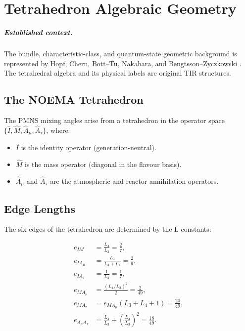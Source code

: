 \chapter{Tetrahedron Algebraic Geometry}
\label{app:tetrahedron}


\paragraph{Established context.}
The bundle, characteristic-class, and quantum-state geometric background is
represented by Hopf, Chern, Bott--Tu, Nakahara, and Bengtsson--Zyczkowski
\cite{Hopf1931,Chern1946,BottTu1982,Nakahara2003,BengtssonZyczkowski2006}.
The tetrahedral algebra and its physical labels are original TIR structures.

\section{The NOEMA Tetrahedron}

The PMNS mixing angles arise from a tetrahedron in the operator space
$\{\hat I, \hat M, \hat A_\mu, \hat A_\tau\}$, where:

\begin{itemize}
\item $\hat I$ is the identity operator (generation-neutral).
\item $\hat M$ is the mass operator (diagonal in the flavour basis).
\item $\hat A_\mu$ and $\hat A_\tau$ are the atmospheric and reactor
annihilation operators.
\end{itemize}

\section{Edge Lengths}

The six edges of the tetrahedron are determined by the L-constants:

\[
\begin{aligned}
e_{IM} &= \frac{L_4}{L_3} = \frac{2}{7}, \\[4pt]
e_{IA_\mu} &= \frac{L_4}{L_3+L_4} = \frac{2}{9}, \\[4pt]
e_{IA_\tau} &= \frac{1}{L_3} = \frac{1}{7}, \\[4pt]
e_{MA_\mu} &= \frac{(L_4/L_3)^2}{2} = \frac{2}{49}, \\[4pt]
e_{MA_\tau} &= e_{MA_\mu}(L_3+L_4+1) = \frac{20}{49}, \\[4pt]
e_{A_\mu A_\tau} &= \frac{L_4}{L_3} + \left(\frac{L_4}{L_3}\right)^2 = \frac{18}{49}.
\end{aligned}
\]

